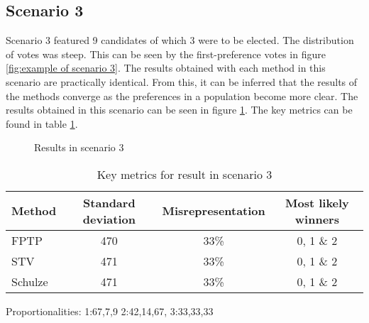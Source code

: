 \documentclass[12pt]{article}
\begin{document}
\subsection{Scenario 3}
Scenario 3 featured 9 candidates of which 3 were to be elected. The distribution of votes was steep. This can be seen by the first-preference votes in figure \ref{fig:example of scenario 3}. The results obtained with each method in this scenario are practically identical. From this, it can be inferred that the results of the methods converge as the preferences in a population become more clear. The results obtained in this scenario can be seen in figure \ref{fig:scenario 3 result}. The key metrics can be found in table \ref{tab:scenario 3 result}.
\begin{figure}[H]
	\centering
	\caption{Results in scenario 3}
	\label{fig:scenario 3 result}
\end{figure}

\begin{table}[H]
	\centering
	\caption{Key metrics for result in scenario 3}
	\label{tab:scenario 3 result}
	\begin{tabular}{@{}lccc@{}}
		\toprule
		Method & Standard deviation & Misrepresentation & Most likely winners \\ \midrule
		FPTP & 470 & 33\% & 0, 1 \& 2 \\
		STV & 471 & 33\% & 0, 1 \& 2 \\
		Schulze & 471 & 33\% & 0, 1 \& 2  \\ \bottomrule
	\end{tabular}
\end{table}
Proportionalities: 1:67,7,9 2:42,14,67, 3:33,33,33
\end{document}
